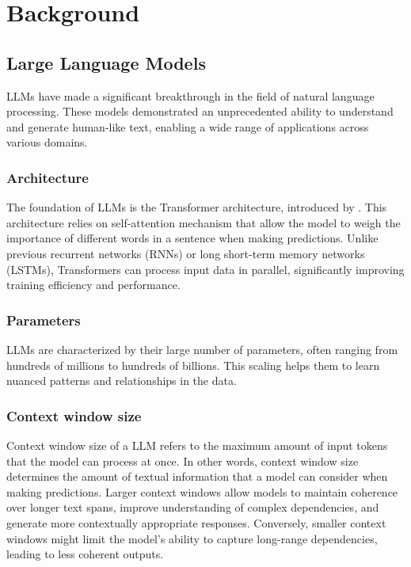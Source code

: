 \chapter{Background}

\section{Large Language Models}

LLMs have made a significant breakthrough in the field of natural language processing. These models demonstrated an unprecedented ability to understand and generate human-like text, enabling a wide range of applications across various domains.


\subsection{Architecture}

The foundation of LLMs is the Transformer architecture, introduced by \citet{Vaswani2017}. This architecture relies on self-attention mechanism that allow the model to weigh the importance of different words in a sentence when making predictions. Unlike previous recurrent networks (RNNs) or long short-term memory networks (LSTMs), Transformers can process input data in parallel, significantly improving training efficiency and performance.


\subsection{Parameters}

LLMs are characterized by their large number of parameters, often ranging from hundreds of millions to hundreds of billions. This scaling helps them to learn nuanced patterns and relationships in the data.


\subsection{Context window size}

Context window size of a LLM refers to the maximum amount of input tokens that the model can process at once. In other words, context window size determines the amount of textual information that a model can consider when making predictions. Larger context windows allow models to maintain coherence over longer text spans, improve understanding of complex dependencies, and generate more contextually appropriate responses. Conversely, smaller context windows might limit the model's ability to capture long-range dependencies, leading to less coherent outputs.


